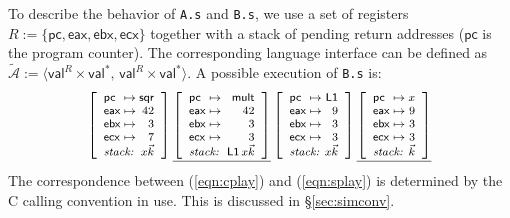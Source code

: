 \documentclass[sigplan,10pt,review]{acmart}
\newcommand{\kw}[1]{\ensuremath{ \mathsf{#1} }}
\begin{document}
\begin{example}
To describe the behavior of \texttt{A.s} and \texttt{B.s},
we use a set of registers
$R := \{ \kw{pc}, \kw{eax}, \kw{ebx}, \kw{ecx} \}$
together with a stack of pending return addresses
($\kw{pc}$ is the program counter).
The corresponding language interface can be defined as
$\tilde{\mathcal{A}} :=
 \langle \kw{val}^R \times \kw{val}^*, \,
         \kw{val}^R \times \kw{val}^* \rangle$.
A possible execution of \texttt{B.s}
is: %
\begin{equation} \label{eqn:splay}
{
  \footnotesize
  \left[
    \begin{array}{l@{{} \mapsto {}}r}
      \kw{pc}  & \kw{sqr} \\
      \kw{eax} & 42 \\
      \kw{ebx} & 3 \\
      \kw{ecx} & 7 \\
      \multicolumn{2}{c}{\textit{stack: } \hfill x \vec{k}}
    \end{array}
  \right] %
  \underline{
    \left[
      \begin{array}{l@{{} \mapsto {}}r}
        \kw{pc}  & \kw{mult} \\
        \kw{eax} & 42 \\
        \kw{ebx} & 3 \\
        \kw{ecx} & 3 \\
        \multicolumn{2}{c}{\textit{stack: } \: \kw{L1} \, x \vec{k}}
      \end{array}
    \right]} %
  \left[
    \begin{array}{l@{{} \mapsto {}}r}
      \kw{pc}  & \kw{L1} \\
      \kw{eax} & 9 \\
      \kw{ebx} & 3 \\
      \kw{ecx} & 3 \\
      \multicolumn{2}{c}{\textit{stack: } \hfill x \vec{k}}
    \end{array}
  \right] %
  \underline{
    \left[
      \begin{array}{l@{{} \mapsto {}}r}
        \kw{pc}  & x \\
        \kw{eax} & 9 \\
        \kw{ebx} & 3 \\
        \kw{ecx} & 3 \\
        \multicolumn{2}{c}{\textit{stack: } \hfill \vec{k}}
      \end{array}
    \right]}
}
\end{equation}
The correspondence between (\ref{eqn:cplay}) and (\ref{eqn:splay})
is determined by the C calling convention in use.
This is discussed in \S\ref{sec:simconv}.
\end{example}
\end{document}
